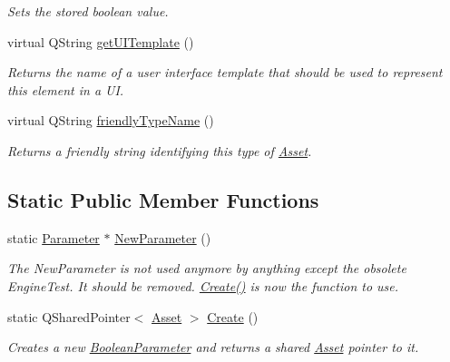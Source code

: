 \begin{DoxyCompactItemize}
\begin{DoxyCompactList}\small\item\em Sets the stored boolean value. \end{DoxyCompactList}\item 
\hypertarget{class_picto_1_1_boolean_parameter_a71686bbd00fba0ffc2ae1774a41b349a}{virtual Q\-String \hyperlink{class_picto_1_1_boolean_parameter_a71686bbd00fba0ffc2ae1774a41b349a}{get\-U\-I\-Template} ()}\label{class_picto_1_1_boolean_parameter_a71686bbd00fba0ffc2ae1774a41b349a}

\begin{DoxyCompactList}\small\item\em Returns the name of a user interface template that should be used to represent this element in a U\-I. \end{DoxyCompactList}\item 
virtual Q\-String \hyperlink{class_picto_1_1_boolean_parameter_ab7a23ee3a18abbf86efff0931f5de198}{friendly\-Type\-Name} ()
\begin{DoxyCompactList}\small\item\em Returns a friendly string identifying this type of \hyperlink{class_picto_1_1_asset}{Asset}. \end{DoxyCompactList}\end{DoxyCompactItemize}
\subsection*{Static Public Member Functions}
\begin{DoxyCompactItemize}
\item 
\hypertarget{class_picto_1_1_boolean_parameter_a3a00fafda63ff67db0a5ad8112e358ac}{static \hyperlink{class_picto_1_1_parameter}{Parameter} $\ast$ \hyperlink{class_picto_1_1_boolean_parameter_a3a00fafda63ff67db0a5ad8112e358ac}{New\-Parameter} ()}\label{class_picto_1_1_boolean_parameter_a3a00fafda63ff67db0a5ad8112e358ac}

\begin{DoxyCompactList}\small\item\em The New\-Parameter is not used anymore by anything except the obsolete Engine\-Test. It should be removed. \hyperlink{class_picto_1_1_boolean_parameter_a3171e9bae5960ed54c03d1efc870b338}{Create()} is now the function to use. \end{DoxyCompactList}\item 
\hypertarget{class_picto_1_1_boolean_parameter_a3171e9bae5960ed54c03d1efc870b338}{static Q\-Shared\-Pointer$<$ \hyperlink{class_picto_1_1_asset}{Asset} $>$ \hyperlink{class_picto_1_1_boolean_parameter_a3171e9bae5960ed54c03d1efc870b338}{Create} ()}\label{class_picto_1_1_boolean_parameter_a3171e9bae5960ed54c03d1efc870b338}

\begin{DoxyCompactList}\small\item\em Creates a new \hyperlink{class_picto_1_1_boolean_parameter}{Boolean\-Parameter} and returns a shared \hyperlink{class_picto_1_1_asset}{Asset} pointer to it. \end{DoxyCompactList}\end{DoxyCompactItemize}
